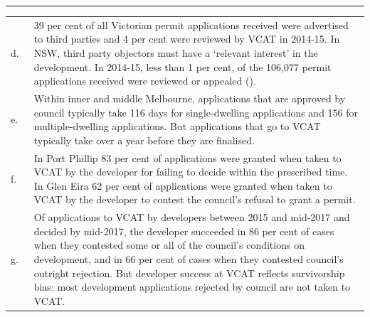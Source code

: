 \begin{boxshell}
\begin{fullpage}
\begin{mdframed}[style=GrattanFrameBoxB]
\begin{multicols}{2}
		\rule{0.2\columnwidth}{0.4pt}\linebreak
		\begin{tabularx}{\columnwidth}{@{}>{\centering\footnotesize}p{1.5em}@{}>{\footnotesize\arraybackslash}X}
		d.~\null &
		    {39 per cent of all Victorian permit applications received were advertised to third parties and 4 per cent were reviewed by VCAT in 2014-15.
		    In NSW, third party objectors must have a `relevant interest' in the development.
		    In 2014-15, less than 1 per cent, of the 106,077 permit applications received were reviewed or appealed (\textcite[][28]{PC-2017-shifting-dial-potential-of-land}).} \\
		e.~\null &
		    {Within inner and middle Melbourne, applications that are approved by council typically take 116 days for single-dwelling applications and 156 for multiple-dwelling applications. But applications that go to VCAT typically take over a year before they are finalised.} \\
		f.~\null &
            {In Port Phillip 83 per cent of applications were granted when taken to VCAT by the developer for failing to decide within the prescribed time.
			In Glen Eira 62 per cent of applications were granted when taken to VCAT by the developer to contest the council’s refusal to grant a permit.} \\
		g.~\null &
            {Of applications to VCAT by developers between 2015 and mid-2017 and decided by mid-2017, the developer succeeded in 86 per cent of cases when they contested some or all of the council's conditions on development, and in 66 per cent of cases when they contested council's outright rejection.
            But developer success at VCAT reflects survivorship bias: most development applications rejected by council are not taken to VCAT.} \\

		\end{tabularx}



\end{multicols}
\end{mdframed}
\end{fullpage}
\end{boxshell}
